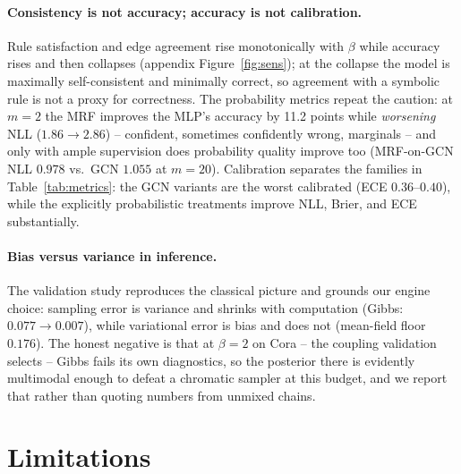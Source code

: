 \documentclass{article}
\begin{document}
\paragraph{Consistency is not accuracy; accuracy is not calibration.} Rule satisfaction and
edge agreement rise monotonically with $\beta$ while accuracy rises and then collapses
(appendix Figure~\ref{fig:sens}); at the collapse the model is maximally self-consistent and
minimally correct, so agreement with a symbolic rule is not a proxy for correctness. The
probability metrics repeat the caution: at $m{=}2$ the MRF improves the MLP's accuracy by 11.2
points while \emph{worsening} NLL ($1.86\to2.86$) -- confident, sometimes confidently wrong,
marginals -- and only with ample supervision does probability quality improve too
(MRF-on-GCN NLL $0.978$ vs.\ GCN $1.055$ at $m{=}20$). Calibration separates the families in
Table~\ref{tab:metrics}: the GCN variants are the worst calibrated (ECE $0.36$--$0.40$),
while the explicitly probabilistic treatments improve NLL, Brier, and ECE substantially.

\paragraph{Bias versus variance in inference.} The validation study reproduces the classical
picture \citep{murphy1999loopy} and grounds our engine choice: sampling error is variance and
shrinks with computation (Gibbs: $0.077\to0.007$), while variational error is bias and does not
(mean-field floor $0.176$). The honest negative is that at $\beta{=}2$ on Cora -- the coupling
validation selects -- Gibbs fails its own diagnostics, so the posterior there is evidently
multimodal enough to defeat a chromatic sampler at this budget, and we report that rather than
quoting numbers from unmixed chains.

\section{Limitations}
\end{document}
